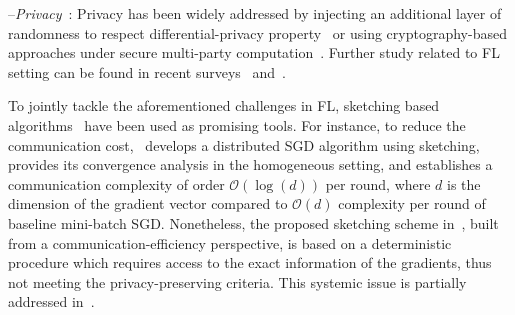 \documentclass[sigconf, anonymous, review]{acmart}
\begin{document}
 --\emph{Privacy}~\citep{geyer2017differentially,hardy2017private}: Privacy has been widely addressed by injecting an additional layer of randomness to respect differential-privacy property~\citep{mcmahan2017learning} or using cryptography-based approaches under secure multi-party computation~\citep{bonawitz2017practical}. 
  Further study related to FL setting can be found in recent surveys~\citep{li2019federated} and~\citep{kairouz2019advances}.


To jointly tackle the aforementioned challenges in FL, sketching based algorithms~\citep{DBLP:journals/tcs/CharikarCF04,cormode2005improved,kleinberg2003bursty,Proc:Li_Church_Hastie_NIPS08} 
have been used as promising tools. 
For instance, to reduce the communication cost,~\citep{ivkin2019communication} develops a distributed SGD algorithm using sketching, provides its convergence analysis in the homogeneous setting, and establishes a communication complexity of order $\mathcal{O}(\log(d))$ per round, where $d$ is the dimension of the gradient vector compared to $\mathcal{O}(d)$ complexity per round of baseline mini-batch SGD. Nonetheless, the proposed sketching scheme in~\cite{ivkin2019communication}, built from a communication-efficiency perspective, is based on a deterministic procedure which requires access to the exact information of the gradients, thus not meeting the  privacy-preserving criteria.
This systemic issue is partially addressed in~\cite{rothchild2020fetchsgd}. 
\end{document}
